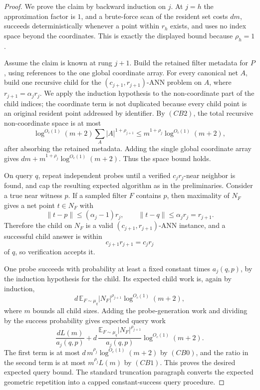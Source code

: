 \documentclass[10pt]{article}
\theoremstyle{definition}
\newcommand{\E}{\mathbb{E}}
\begin{document}
\begin{proof}
   We prove the claim by backward induction on \(j\).  At \(j=h\) the
   approximation factor is \(1\), and a brute-force scan of the resident set
   costs \(dm\), succeeds deterministically whenever a point within \(r_h\)
   exists, and uses no index space beyond the coordinates.  This is exactly the
   displayed bound because \(\rho_h=1\).

   Assume the claim is known at rung \(j+1\).  Build the retained filter
   metadata for \(P\), using references to the one global coordinate array.
   For every canonical net \(A\), build one recursive child for the
   \((c_{j+1},r_{j+1})\)-ANN problem on \(A\), where
   \(r_{j+1}=\alpha_jr_j\).  We apply the induction hypothesis to the
   non-coordinate part of the child indices; the coordinate term is not
   duplicated because every child point is an original resident point addressed
   by identifier.  By \((CB2)\), the total recursive non-coordinate space is at
   most
   \[
      \log^{O_c(1)}(m+2)
      \sum_A |A|^{1+\rho_{j+1}}
      \le
      m^{1+\rho_j}\log^{O_c(1)}(m+2),
   \]
   after absorbing the retained metadata.  Adding the single global coordinate
   array gives \(dm+m^{1+\rho_j}\log^{O_c(1)}(m+2)\).  Thus the space bound
   holds.

   On query \(q\), repeat independent probes until a verified \(c_jr_j\)-near
   neighbor is found, and cap the resulting expected algorithm as in the
   preliminaries.  Consider a true near witness \(p\).  If a sampled filter
   \(F\) contains \(p\), then maximality of \(N_F\) gives a net point
   \(t\in N_F\) with
   \[
      \|t-p\|\le(\alpha_j-1)r_j,
      \qquad
      \|t-q\|\le\alpha_jr_j=r_{j+1}.
   \]
   Therefore the child on \(N_F\) is a valid \((c_{j+1},r_{j+1})\)-ANN
   instance, and a successful child answer is within
   \[
      c_{j+1}r_{j+1}=c_jr_j
   \]
   of \(q\), so verification accepts it.

   One probe succeeds with probability at least a fixed constant times
   \(a_j(q,p)\), by the induction hypothesis for the child.  Its expected child
   work is, again by induction,
   \[
      d\,\E_{F\sim\mu_q}|N_F|^{\rho_{j+1}}\log^{O_c(1)}(m+2),
   \]
   where \(m\) bounds all child sizes.  Adding the probe-generation work and
   dividing by the success probability gives expected query work
   \[
      \frac{dL(m)}{a_j(q,p)}
      +
      d\,\frac{
         \E_{F\sim\mu_q}|N_F|^{\rho_{j+1}}
      }{a_j(q,p)}
      \log^{O_c(1)}(m+2).
   \]
   The first term is at most
   \(d\,m^{\rho_j}\log^{O_c(1)}(m+2)\) by \((CB0)\), and the ratio in the
   second term is at most \(m^{\rho_j}L(m)\) by \((CB1)\).  This proves the
   desired expected query bound.  The standard truncation paragraph converts
   the expected geometric repetition into a capped constant-success query
   procedure.
\end{proof}
\end{document}

